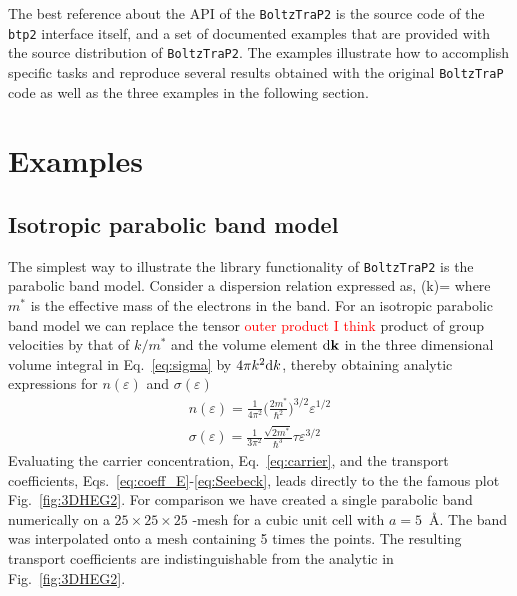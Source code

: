 \documentclass[final,5p,times,twocolumn,sort&compress]{elsarticle}
\begin{document}
The best reference about the API of the \texttt{BoltzTraP2} is the source code of the \texttt{btp2} interface itself, and a set of documented examples that are provided with the source distribution of \texttt{BoltzTraP2}. The examples illustrate how to accomplish specific tasks and reproduce several results obtained with the original \texttt{BoltzTraP} code as well as the three examples in the following section.

\section{Examples}
\subsection{Isotropic parabolic band model}
The simplest way to illustrate the library functionality of \texttt{BoltzTraP2} is the parabolic band model. Consider a dispersion relation expressed as, 
\beq
\varepsilon(k)=
\label{eq:model}
\eeq
where $m^*$ is the effective mass of the electrons in the band. For an isotropic  parabolic band model we can replace the tensor 
\textcolor{red}{outer product I think}
product of group velocities by that of $k/m^*$
 and the volume element ${\textrm d}{\bf k}$ in the three dimensional volume integral in Eq.~\eqref{eq:sigma} by $4\pi k^2{\textrm d} k$, thereby obtaining analytic expressions for $n(\varepsilon)$ and $\sigma(\varepsilon)$ 
\begin{gather}
n(\varepsilon)=\frac{1}{4\pi^2}\biggl(\frac{2m^*}{\hbar^2}\biggr)^{3/2} \varepsilon^{1/2}  \\
\sigma(\varepsilon)= \frac{1}{3\pi^2}\frac{\sqrt{2m^*}}{\hbar^3} \tau  \varepsilon^{3/2}
\label{eq:coeff2}
\end{gather}
Evaluating the carrier concentration, Eq.~\eqref{eq:carrier}, and the transport coefficients, Eqs.~\eqref{eq:coeff_E}-\eqref{eq:Seebeck}, leads directly to the  the famous plot Fig.~\ref{fig:3DHEG2}. For comparison we have created a single parabolic band numerically on a $25\times 25\times 25$ \bk-mesh for a cubic unit cell with $a=5$~\AA. The band was interpolated onto a mesh containing 5 times the points. The resulting transport coefficients are indistinguishable from the analytic in Fig.~\ref{fig:3DHEG2}.
\end{document}
